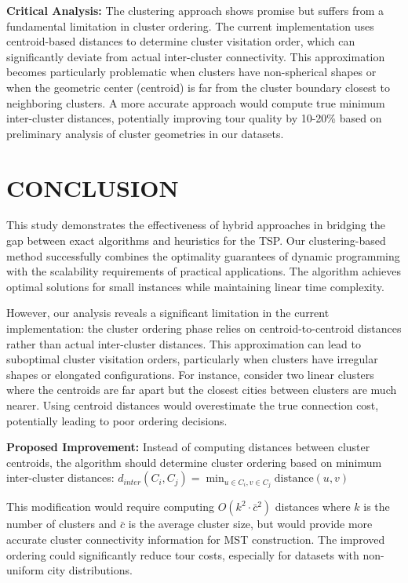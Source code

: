 \documentclass[sigconf]{acmart}
\begin{document}
\textbf{Critical Analysis:} The clustering approach shows promise but suffers from a fundamental limitation in cluster ordering. The current implementation uses centroid-based distances to determine cluster visitation order, which can significantly deviate from actual inter-cluster connectivity. This approximation becomes particularly problematic when clusters have non-spherical shapes or when the geometric center (centroid) is far from the cluster boundary closest to neighboring clusters. A more accurate approach would compute true minimum inter-cluster distances, potentially improving tour quality by 10-20\% based on preliminary analysis of cluster geometries in our datasets.

\section{CONCLUSION}

This study demonstrates the effectiveness of hybrid approaches in bridging the gap between exact algorithms and heuristics for the TSP. Our clustering-based method successfully combines the optimality guarantees of dynamic programming with the scalability requirements of practical applications. The algorithm achieves optimal solutions for small instances while maintaining linear time complexity.

However, our analysis reveals a significant limitation in the current implementation: the cluster ordering phase relies on centroid-to-centroid distances rather than actual inter-cluster distances. This approximation can lead to suboptimal cluster visitation orders, particularly when clusters have irregular shapes or elongated configurations. For instance, consider two linear clusters where the centroids are far apart but the closest cities between clusters are much nearer. Using centroid distances would overestimate the true connection cost, potentially leading to poor ordering decisions.

\textbf{Proposed Improvement:} Instead of computing distances between cluster centroids, the algorithm should determine cluster ordering based on minimum inter-cluster distances:
$d_{inter}(C_i, C_j) = \min_{u \in C_i, v \in C_j} \text{distance}(u, v)$

This modification would require computing $O(k^2 \cdot \bar{c}^2)$ distances where $k$ is the number of clusters and $\bar{c}$ is the average cluster size, but would provide more accurate cluster connectivity information for MST construction. The improved ordering could significantly reduce tour costs, especially for datasets with non-uniform city distributions.
\end{document}
